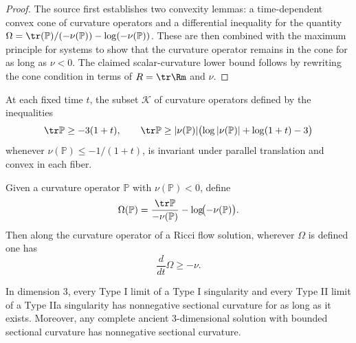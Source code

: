 \begin{proof}
\sketch The source first establishes two convexity lemmas: a time-dependent convex cone of curvature operators and a differential inequality for the quantity \(\Omega=\tr(\mathbb P)/(-\nu(\mathbb P))-\log(-\nu(\mathbb P))\). These are then combined with the maximum principle for systems to show that the curvature operator remains in the cone for as long as \(\nu<0\). The claimed scalar-curvature lower bound follows by rewriting the cone condition in terms of \(R=\tr \Rm\) and \(\nu\).
\end{proof}

\begin{lemma}
\label{ch09-lem-pinching-cone-convexity}
At each fixed time \(t\), the subset \(\mathcal K\) of curvature operators defined by the inequalities
\[
\tr\mathbb P\ge -3(1+t),\qquad
\tr\mathbb P\ge |\nu(\mathbb P)|\bigl(\log|\nu(\mathbb P)|+\log(1+t)-3\bigr)
\]
whenever \(\nu(\mathbb P)\le -1/(1+t)\), is invariant under parallel translation and convex in each fiber.
\end{lemma}

\begin{lemma}
\label{ch09-lem-omega-derivative}
Given a curvature operator \(\mathbb P\) with \(\nu(\mathbb P)<0\), define
\[
\Omega(\mathbb P)=\frac{\tr\mathbb P}{-\nu(\mathbb P)}-\log\!\bigl(-\nu(\mathbb P)\bigr).
\]
Then along the curvature operator of a Ricci flow solution, wherever \(\Omega\) is defined one has
\[
\frac{d}{dt}\Omega\ge -\nu.
\]
\end{lemma}

\begin{corollary}
\label{ch09-cor-nonnegative-curvature-limits}
In dimension \(3\), every Type I limit of a Type I singularity and every Type II limit of a Type IIa singularity has nonnegative sectional curvature for as long as it exists. Moreover, any complete ancient \(3\)-dimensional solution with bounded sectional curvature has nonnegative sectional curvature.
\end{corollary}

